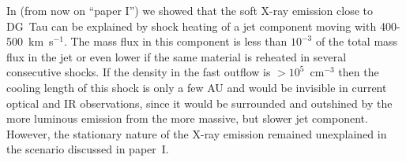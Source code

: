 In \citet{2009A&A...493..579G} (from now on ``paper I'') we showed that the soft X-ray emission close to DG~Tau can be explained by shock heating of a jet component moving with 400-500~km~s$^{-1}$. The mass flux in this component is less than $10^{-3}$ of the total mass flux in the jet or even lower if the same material is reheated in several consecutive shocks. If the density in the fast outflow is $>10^5$~cm$^{-3}$ then the cooling length of this shock is only a few AU and would be invisible in current optical and IR observations, since it would be surrounded and outshined by the more luminous emission from the more massive, but slower jet component. However, the stationary nature of the X-ray emission remained unexplained in the scenario discussed in paper~I.